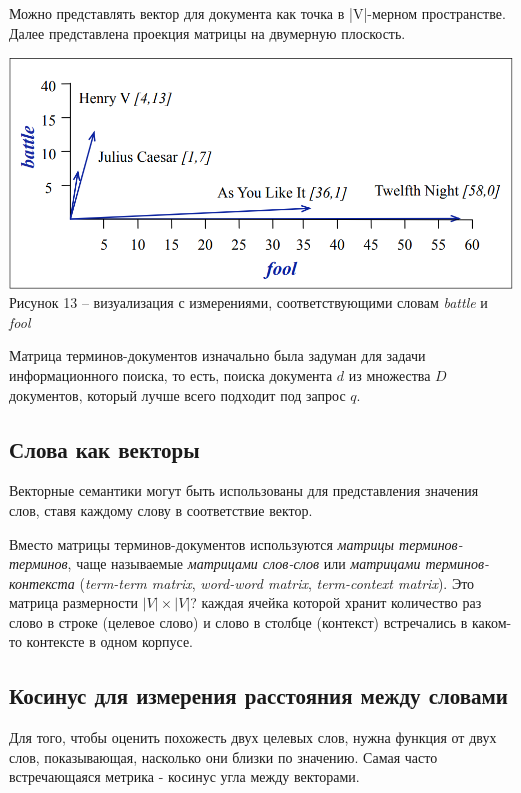 \documentclass[a4paper,12pt,preview]{report} %
\begin{document}
	Можно представлять вектор для документа как точка в |V|-мерном пространстве. Далее представлена проекция матрицы на  двумерную плоскость.
	
	\begin{center}
		\includegraphics[scale=0.6]{proje.PNG}
		\\ Рисунок 13 -- визуализация с измерениями, соответствующими словам \textit{battle} и \textit{fool}
	\end{center}
	
	Матрица терминов-документов изначально была задуман для задачи информационного поиска, то есть, поиска документа $d$ из множества $D$ документов, который лучше всего подходит под запрос $q$.
	
	
	\subsection{Слова как векторы}
	
	Векторные семантики могут быть использованы для представления значения слов, ставя каждому слову в соответствие вектор.
	
	Вместо матрицы терминов-документов используются \textit{матрицы терминов-терминов}, чаще называемые \textit{матрицами слов-слов} или \textit{матрицами терминов-контекста} (\textit{term-term matrix}, \textit{word-word matrix}, \textit{term-context matrix}).
	 Это матрица размерности $|V| \times |V|$? каждая ячейка которой хранит количество раз слово в строке (целевое слово) и слово в столбце (контекст) встречались в каком-то контексте в одном корпусе.
	 
	 \subsection{Косинус для измерения расстояния между словами}
	 
	Для того, чтобы оценить похожесть двух целевых слов, нужна функция от двух слов, показывающая, насколько они близки по значению. Самая часто встречающаяся метрика - косинус угла между векторами.
	
\end{document}
